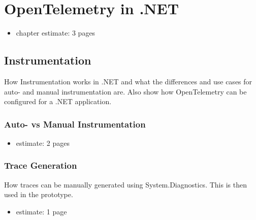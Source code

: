 \chapter{OpenTelemetry in .NET}
\label{chap:dotnet}

\begin{itemize}
    \item chapter estimate: 3 pages
\end{itemize}

\section{Instrumentation}
\label{sec:d_instrumentation}

How Instrumentation works in .NET and what the differences and use cases for auto- and manual instrumentation are.
Also show how OpenTelemetry can be configured for a .NET application.

\subsection{Auto- vs Manual Instrumentation}

\begin{itemize}
    \item estimate: 2 pages
\end{itemize}

\subsection{Trace Generation}
\label{sec:d_trace_generation}

How traces can be manually generated using System.Diagnostics. This is then used in the prototype.

\begin{itemize}
    \item estimate: 1 page
\end{itemize}
